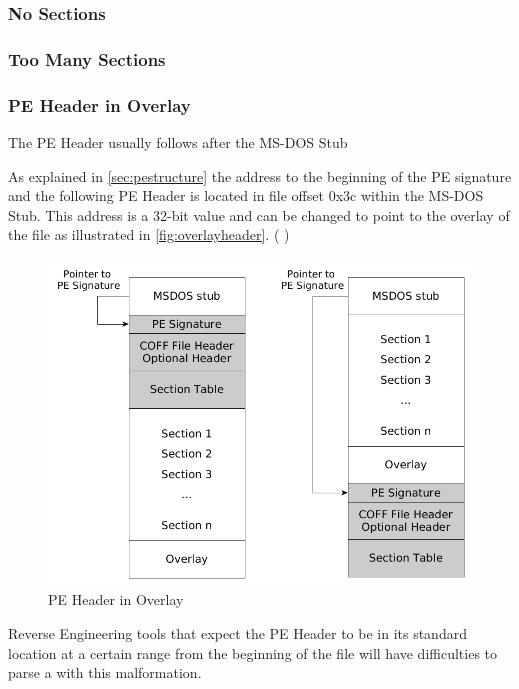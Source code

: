 \subsubsection*{No Sections}

\subsubsection*{Too Many Sections}

\subsubsection*{PE Header in Overlay}

The PE Header usually follows after the MS-DOS Stub 

As explained in \autoref{sec:pestructure} the address to the beginning of the PE signature and the following PE Header is located in file offset 0x3c within the MS-DOS Stub. This address is a 32-bit value and can be changed to point to the overlay of the file as illustrated in \autoref{fig:overlayheader}. (\cf{} \cite[slide 13]{vuksan11})

\begin{figure}
\includegraphics[width=.98\textwidth, height=.60\textheight,keepaspectratio]{graphics/overlayheader}
\caption{PE Header in Overlay }
\label{fig:overlayheader} 
\end{figure}

Reverse Engineering tools that expect the PE Header to be in its standard location at a certain range from the beginning of the file will have difficulties to parse a \PE{} with this malformation.

